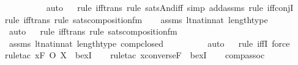 \begin{isabellebody}
\ \ \ \ \ \ \ \ \isamarkupfalse%
\ auto{\isacharbrackleft}{\kern0pt}{}{\isacharbrackright}{\kern0pt}\isanewline
\ \ \isamarkupfalse%
{\isacharparenleft}{\kern0pt}rule\ iff{\isacharunderscore}{\kern0pt}trans{\isacharcomma}{\kern0pt}\ rule\ sats{\isacharunderscore}{\kern0pt}And{\isacharunderscore}{\kern0pt}iff{\isacharcomma}{\kern0pt}\ simp\ add{\isacharcolon}{\kern0pt}assms{\isacharcomma}{\kern0pt}\ rule\ iff{\isacharunderscore}{\kern0pt}conjI{}{\isacharparenright}{\kern0pt}\isanewline
\ \ \isamarkupfalse%
{\isacharparenleft}{\kern0pt}rule\ iff{\isacharunderscore}{\kern0pt}trans{\isacharcomma}{\kern0pt}\ rule\ sats{\isacharunderscore}{\kern0pt}composition{\isacharunderscore}{\kern0pt}fm{\isacharparenright}{\kern0pt}\isanewline
\ \ \isamarkupfalse%
\ assms\ lt{\isacharunderscore}{\kern0pt}nat{\isacharunderscore}{\kern0pt}in{\isacharunderscore}{\kern0pt}nat\ length{\isacharunderscore}{\kern0pt}type\isanewline
\ \ \ \ \ \ \ \isamarkupfalse%
\ auto{\isacharbrackleft}{\kern0pt}{}{\isacharbrackright}{\kern0pt}\isanewline
\ \ \isamarkupfalse%
{\isacharparenleft}{\kern0pt}rule\ iff{\isacharunderscore}{\kern0pt}trans{\isacharcomma}{\kern0pt}\ rule\ sats{\isacharunderscore}{\kern0pt}composition{\isacharunderscore}{\kern0pt}fm{\isacharparenright}{\kern0pt}\isanewline
\ \ \isamarkupfalse%
\ assms\ lt{\isacharunderscore}{\kern0pt}nat{\isacharunderscore}{\kern0pt}in{\isacharunderscore}{\kern0pt}nat\ length{\isacharunderscore}{\kern0pt}type\ comp{\isacharunderscore}{\kern0pt}closed\ \isanewline
\ \ \ \ \ \ \ \isamarkupfalse%
\ auto{\isacharbrackleft}{\kern0pt}{}{\isacharbrackright}{\kern0pt}\isanewline
\ \ \isamarkupfalse%
{\isacharparenleft}{\kern0pt}rule\ iffI{\isacharcomma}{\kern0pt}\ force{\isacharparenright}{\kern0pt}\isanewline
\ \ \isamarkupfalse%
{\isacharparenleft}{\kern0pt}rule{\isacharunderscore}{\kern0pt}tac\ x{\isacharequal}{\kern0pt}{\isachardoublequoteopen}F\ O\ X{\isachardoublequoteclose}\ \ bexI{\isacharparenright}{\kern0pt}\isanewline
\ \ \ \isamarkupfalse%
{\isacharparenleft}{\kern0pt}rule{\isacharunderscore}{\kern0pt}tac\ x{\isacharequal}{\kern0pt}{\isachardoublequoteopen}converse{\isacharparenleft}{\kern0pt}F{\isacharparenright}{\kern0pt}{\isachardoublequoteclose}\ \ bexI{\isacharparenright}{\kern0pt}\isanewline
\ \ \isamarkupfalse%
\ comp{\isacharunderscore}{\kern0pt}assoc\isanewline

\end{isabellebody}
